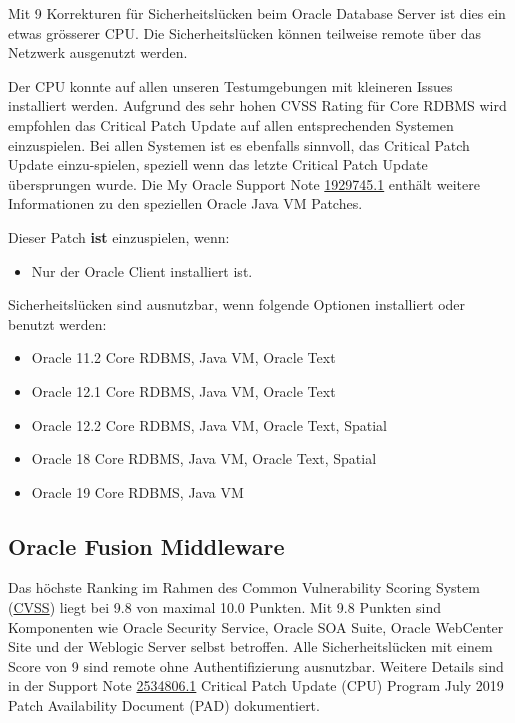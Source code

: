 Mit 9 Korrekturen für Sicherheitslücken beim Oracle Database Server ist
dies ein etwas grösserer CPU. Die Sicherheitslücken können teilweise
remote über das Netzwerk ausgenutzt werden.

Der CPU konnte auf allen unseren Testumgebungen mit kleineren Issues
installiert werden. Aufgrund des sehr hohen CVSS Rating für Core RDBMS
wird empfohlen das Critical Patch Update auf allen entsprechenden
Systemen einzuspielen. Bei allen Systemen ist es ebenfalls sinnvoll, das
Critical Patch Update einzu-spielen, speziell wenn das letzte Critical
Patch Update übersprungen wurde. Die My Oracle Support Note
\href{https://support.oracle.com/epmos/faces/DocumentDisplay?id=1929745.1}{1929745.1}
enthält weitere Informationen zu den speziellen Oracle Java VM Patches.

Dieser Patch \textbf{ist} einzuspielen, wenn:

\begin{itemize}
\tightlist
\item
  Nur der Oracle Client installiert ist.
\end{itemize}

Sicherheitslücken sind ausnutzbar, wenn folgende Optionen installiert
oder benutzt werden:

\begin{itemize}
\tightlist
\item
  Oracle 11.2 Core RDBMS, Java VM, Oracle Text
\item
  Oracle 12.1 Core RDBMS, Java VM, Oracle Text
\item
  Oracle 12.2 Core RDBMS, Java VM, Oracle Text, Spatial
\item
  Oracle 18 Core RDBMS, Java VM, Oracle Text, Spatial
\item
  Oracle 19 Core RDBMS, Java VM
\end{itemize}

\hypertarget{oracle-fusion-middleware}{%
\subsection{Oracle Fusion Middleware}\label{oracle-fusion-middleware}}

Das höchste Ranking im Rahmen des Common Vulnerability Scoring System
(\href{http://www.first.org/cvss/}{CVSS}) liegt bei 9.8 von maximal 10.0
Punkten. Mit 9.8 Punkten sind Komponenten wie Oracle Security Service,
Oracle SOA Suite, Oracle WebCenter Site und der Weblogic Server selbst
betroffen. Alle Sicherheitslücken mit einem Score von 9 sind remote ohne
Authentifizierung ausnutzbar. Weitere Details sind in der Support Note
\href{https://support.oracle.com/epmos/faces/DocumentDisplay?id=2534806.1}{2534806.1}
Critical Patch Update (CPU) Program July 2019 Patch Availability
Document (PAD) dokumentiert.

